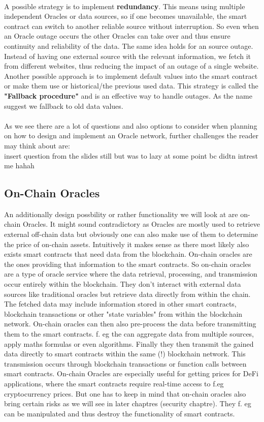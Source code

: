 \documentclass{article}
\begin{document}
\\
A possible strategy is to implement \textbf{redundancy}. This means using multiple independent Oracles or data sources, so if one becomes unavailable, the smart contract can switch to another reliable source without interruption. So even when an Oracle outage occurs the other Oracles can take over and thus ensure continuity and reliability of the data.
The same idea holds for an source outage. Instead of having one external source with the relevant information, we fetch it from different websites, thus reducing the impact of an outage of a single website. Another possible approach is to implement default values into the smart contract or make them use or historical/the previous used data. This strategy is called the \textbf{"Fallback procedure"} and is an effective way to handle outages. As the name suggest we fallback to old data values.\\
\\
As we see there are a lot of questions and also options to consider when planning on how to design and implement an Oracle network, further challenges the reader may think about are:
\\
insert question from the slides still but was to lazy at some point bc didtn intrest me hahah
\\

\subsection{On-Chain Oracles}
An additionally design possbility or rather functionality we will look at are on-chain Oracles. It might sound contradictory as Oracles are mostly used to retrieve external off-chain data but obviously one can also make use of them to determine the price of on-chain assets. Intuitively it makes sense as there most likely also exists smart contracts that need data from the blockchain. On-chain oracles are the ones providing that information to the smart contracts. So on-chain oracles are a type of oracle service where the data retrieval, processing, and transmission occur entirely within the blockchain. They don't interact with external data sources like traditional oracles but retrieve data directly from within the chain. The fetched data may include information stored in other smart contracts, blockchain transactions or other "state variables" from within the blockchain network. On-chain oracles can then also pre-process the data before transmitting them to the smart contracts. f. eg the can aggregate data from multiple sources, apply maths formulas or even algorithms. Finally they then transmit the gained data directly to smart contracts within the same (!) blockchain network. This transmission occurs through blockchain transactions or function calls between smart contracts. On-chain Oracles are especially useful for getting prices for DeFi applications, where the smart contracts require real-time access to f.eg cryptocurrency prices. But one has to keep in mind that on-chain oracles also bring certain risks as we will see in later chaptres (security chaptre). They f. eg can be manipulated and thus destroy the functionality of smart contracts.
\end{document}
